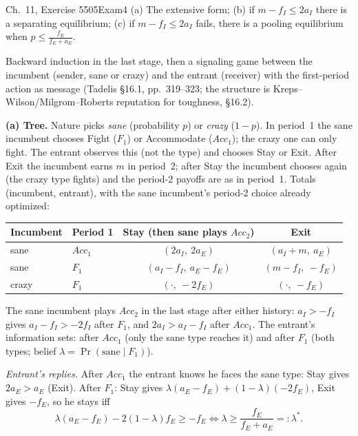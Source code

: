 \begin{exsol}{\MG{} Ch.~11, Exercise 5}{505}{Exam}{4}
\asked (a) The extensive form; (b) if $m - f_I \le 2a_I$ there is a separating equilibrium; (c) if
$m - f_I \le 2a_I$ fails, there is a pooling equilibrium when $p \le \frac{f_E}{f_E + a_E}$.

\method Backward induction in the last stage, then a signaling game between the incumbent (sender,
sane or crazy) and the entrant (receiver) with the first-period action as message (Tadelis \S16.1,
pp.~319--323; the structure is Kreps--Wilson/Milgrom--Roberts reputation for toughness, \S16.2).

\solution \textbf{(a) Tree.} Nature picks \emph{sane} (probability $p$) or \emph{crazy} ($1-p$). In
period~1 the sane incumbent chooses Fight ($F_1$) or Accommodate ($Acc_1$); the crazy one can only fight.
The entrant observes this (not the type) and chooses Stay or Exit. After Exit the incumbent
earns $m$ in period~2; after Stay the incumbent chooses again (the crazy type fights) and the period-2
payoffs are as in period~1. Totals (incumbent, entrant), with the sane incumbent's period-2 choice
already optimized:
\begin{center}
\begin{tabular}{llcc}
\toprule
Incumbent & Period 1 & Stay (then sane plays $Acc_2$) & Exit \\
\midrule
sane & $Acc_1$ & $(2a_I,\ 2a_E)$ & $(a_I + m,\ a_E)$ \\
sane & $F_1$ & $(a_I - f_I,\ a_E - f_E)$ & $(m - f_I,\ -f_E)$ \\
crazy & $F_1$ & $(\cdot,\ -2f_E)$ & $(\cdot,\ -f_E)$ \\
\bottomrule
\end{tabular}
\end{center}
The sane incumbent plays $Acc_2$ in the last stage after either history: $a_I > -f_I$ gives
$a_I - f_I > -2f_I$ after $F_1$, and $2a_I > a_I - f_I$ after $Acc_1$. The entrant's information
sets: after $Acc_1$ (only the sane type reaches it) and after $F_1$ (both types; belief
$\lambda = \Pr(\text{sane} \mid F_1)$).

\emph{Entrant's replies.} After $Acc_1$ the entrant knows he faces the sane type: Stay gives $2a_E >
a_E$ (Exit). After $F_1$: Stay gives $\lambda(a_E - f_E) + (1-\lambda)(-2f_E)$, Exit gives $-f_E$, so he
stays iff
\[
  \lambda(a_E - f_E) - 2(1-\lambda)f_E \ge -f_E \iff \lambda \ge \frac{f_E}{f_E + a_E} =: \lambda^*.
\]


\end{exsol}
